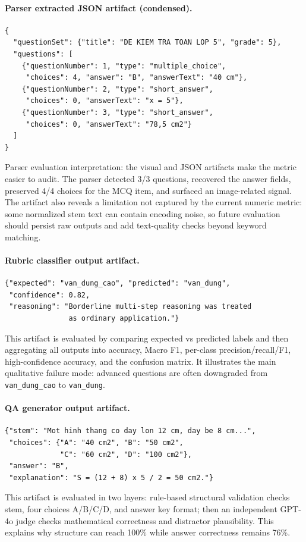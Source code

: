 \documentclass[12pt, a4paper]{article}
\begin{document}
\paragraph{Parser extracted JSON artifact (condensed).}
\begin{verbatim}
{
  "questionSet": {"title": "DE KIEM TRA TOAN LOP 5", "grade": 5},
  "questions": [
    {"questionNumber": 1, "type": "multiple_choice",
     "choices": 4, "answer": "B", "answerText": "40 cm"},
    {"questionNumber": 2, "type": "short_answer",
     "choices": 0, "answerText": "x = 5"},
    {"questionNumber": 3, "type": "short_answer",
     "choices": 0, "answerText": "78,5 cm2"}
  ]
}
\end{verbatim}

Parser evaluation interpretation: the visual and JSON artifacts make the metric easier to audit. The parser detected 3/3 questions, recovered the answer fields, preserved 4/4 choices for the MCQ item, and surfaced an image-related signal. The artifact also reveals a limitation not captured by the current numeric metric: some normalized stem text can contain encoding noise, so future evaluation should persist raw outputs and add text-quality checks beyond keyword matching.

\paragraph{Rubric classifier output artifact.}
\begin{verbatim}
{"expected": "van_dung_cao", "predicted": "van_dung",
 "confidence": 0.82,
 "reasoning": "Borderline multi-step reasoning was treated
               as ordinary application."}
\end{verbatim}
This artifact is evaluated by comparing expected vs predicted labels and then aggregating all outputs into accuracy, Macro F1, per-class precision/recall/F1, high-confidence accuracy, and the confusion matrix. It illustrates the main qualitative failure mode: advanced questions are often downgraded from \texttt{van\_dung\_cao} to \texttt{van\_dung}.

\paragraph{QA generator output artifact.}
\begin{verbatim}
{"stem": "Mot hinh thang co day lon 12 cm, day be 8 cm...",
 "choices": {"A": "40 cm2", "B": "50 cm2",
             "C": "60 cm2", "D": "100 cm2"},
 "answer": "B",
 "explanation": "S = (12 + 8) x 5 / 2 = 50 cm2."}
\end{verbatim}
This artifact is evaluated in two layers: rule-based structural validation checks stem, four choices A/B/C/D, and answer key format; then an independent GPT-4o judge checks mathematical correctness and distractor plausibility. This explains why structure can reach 100\% while answer correctness remains 76\%.
\end{document}

